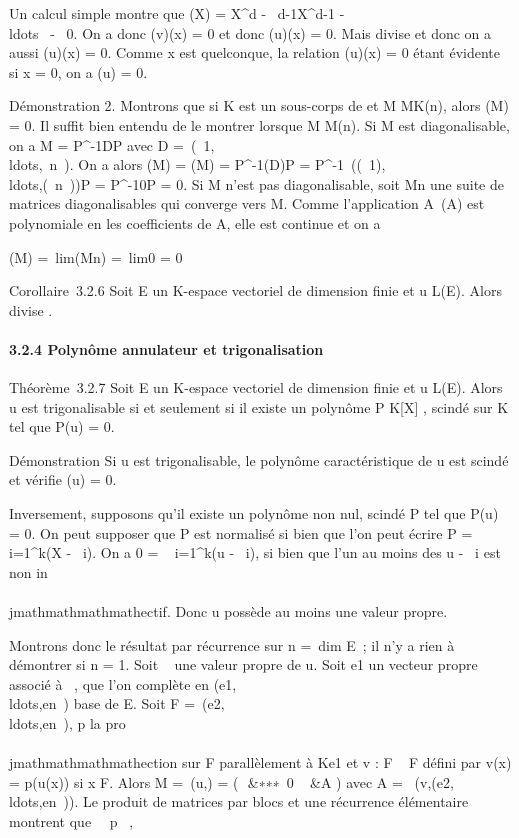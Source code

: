 Un calcul simple montre que \chiv(X) = X^d -
\lambda~d-1X^d-1
-\\ldots~ -
\lambda~0. On a donc \chiv(v)(x) = 0 et donc
\chiv(u)(x) = 0. Mais \chiv divise \chiu et donc on
a aussi \chiu(u)(x) = 0. Comme x est quelconque, la relation
\chiu(u)(x) = 0 étant évidente si x = 0, on a \chiu(u) =
0.

Démonstration 2. Montrons que si K est un sous-corps de  et M \in
MK(n), alors \chiM(M) = 0. Il suffit bien entendu de le
montrer lorsque M \in M(n). Si M est diagonalisable, on a M =
P^-1DP avec D =\
\mathrmdiag(\lambda~1,\\ldots,\lambda~n~).
On a alors \chiM(M) = \chiD(M) =
P^-1\chiD(D)P =
P^-1\
\mathrmdiag(\chiD(\lambda~1),\\ldots,\chiD(\lambda~n~))P
= P^-10P = 0. Si M n'est pas diagonalisable, soit
Mn une suite de matrices diagonalisables qui converge vers M.
Comme l'application A\mapsto~\chiA(A) est
polynomiale en les coefficients de A, elle est continue et on a

\chiM(M) =\
lim\chiMn(Mn) =\
lim0 = 0

Corollaire~3.2.6 Soit E un K-espace vectoriel de dimension finie et u \in
L(E). Alors \muu divise \chiu.

\paragraph{3.2.4 Polynôme annulateur et trigonalisation}

Théorème~3.2.7 Soit E un K-espace vectoriel de dimension finie et u \in
L(E). Alors u est trigonalisable si et seulement si il existe un
polynôme P \in K{[}X{]} \diagdown 0, scindé sur K tel que P(u) = 0.

Démonstration Si u est trigonalisable, le polynôme caractéristique
\chiu de u est scindé et vérifie \chiu(u) = 0.

Inversement, supposons qu'il existe un polynôme non nul, scindé P tel
que P(u) = 0. On peut supposer que P est normalisé si bien que l'on peut
écrire P = \∏ ~
i=1^k(X - \lambda~i). On a 0
= \∏ ~
i=1^k(u - \lambda~i\mathrmId), si
bien que l'un au moins des u - \lambda~i\mathrmId
est non in\\\\jmathmathmathmathectif. Donc u possède au moins une valeur propre.

Montrons donc le résultat par récurrence sur n =\
dim E~; il n'y a rien à démontrer si n = 1. Soit \lambda~ une valeur propre
de u. Soit e1 un vecteur propre associé à \lambda~, que l'on complète
en
(e1,\\ldots,en~)
base de E. Soit F =\
\mathrmVect(e2,\\ldots,en~),
p la pro\\\\jmathmathmathmathection sur F parallèlement à Ke1 et v : F \rightarrow~ F défini
par v(x) = p(u(x)) si x \in F. Alors M =\
\mathrmMat (u,\mathcal{E}) = \left
(\matrix\,\lambda~&∗∗∗ \cr
\matrix\,0 \cr
\⋮~ \cr
0&A \right ) avec A =\
\mathrmMat
(v,(e2,\\ldots,en~)).
Le produit de matrices par blocs et une récurrence élémentaire montrent
que \forall~~p \in \mathbb{N}~,

